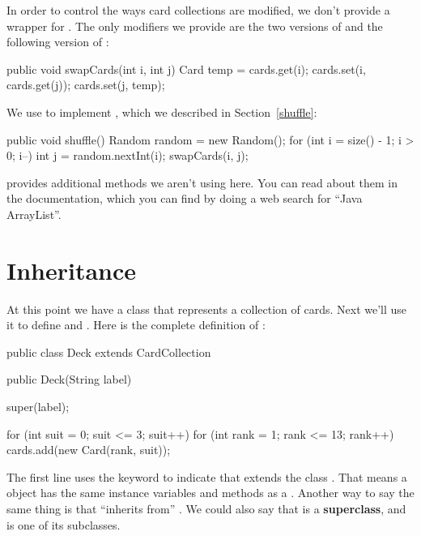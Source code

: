 
In order to control the ways card collections are modified, we don't provide a wrapper for .
The only modifiers we provide are the two versions of  and the following version of :

\begin{code}
public void swapCards(int i, int j) {
    Card temp = cards.get(i);
    cards.set(i, cards.get(j));
    cards.set(j, temp);
}
\end{code}

We use  to implement , which we described in Section~\ref{shuffle}:

\begin{code}
public void shuffle() {
    Random random = new Random();
    for (int i = size() - 1; i > 0; i--) {
        int j = random.nextInt(i);
        swapCards(i, j);
    }
}
\end{code}

 provides additional methods we aren't using here.
You can read about them in the documentation, which you can find by doing a web search for ``Java ArrayList''.


\section{Inheritance}

At this point we have a class that represents a collection of cards.
Next we'll use it to define  and .
Here is the complete definition of :

\begin{code}
public class Deck extends CardCollection {

    public Deck(String label) {
        super(label);

        for (int suit = 0; suit <= 3; suit++) {
            for (int rank = 1; rank <= 13; rank++) {
                cards.add(new Card(rank, suit));
            }
        }
    }
}
\end{code}


The first line uses the keyword  to indicate that  extends the class .
That means a  object has the same instance variables and methods as a .
Another way to say the same thing is that  ``inherits from'' .
We could also say that  is a {\bf superclass}, and  is one of its subclasses.

